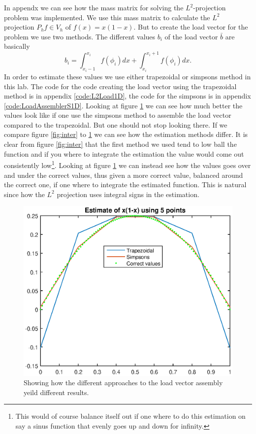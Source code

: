 \documentclass[11pt]{article}
\begin{document}
In appendx \label{code:L2mass1D} we can see how the mass matrix for solving the $L^2$-projection problem was implemented. We use this mass matrix to calculate the $L^2$ projection $P_h f \in V_h$ of $f(x) = x(1-x)$. But to create the load vector for the problem we use two methods. The different values $b_i$ of the load vector $\bar{b}$ are basically 
\begin{equation}
	b_i = \int_{x_i - 1}^{x_i} f(\phi_i) dx + \int_{x_i}^{x_i+1} f(\phi_i) dx.
\end{equation}
In order to estimate these values we use either trapezoidal or simpsons method in this lab. The code for the code creating the load vector using the trapezoidal method is in appendix \ref{code:L2Load1D}, the code for the simpsons is in appendix \ref{code:LoadAssemblerS1D}. Looking at figure \ref{fig:l2proj} we can see how much better the values look like if one use the simpsons method to assemble the load vector compared to the trapezoidal. But one should not stop looking there. If we compare figure \ref{fig:inter} to \ref{fig:l2proj} we can see how the estimation methods differ. It is clear from figure \ref{fig:inter} that the first method we used tend to low ball the function and if you where to integrate the estimation the value would come out consistently low\footnote{This would of course balance itself out if one where to do this estimation on say a sinus function that evenly goes up and down for infinity.}. Looking at figure \ref{fig:l2proj} we can instead see how the values goes over and under the correct values, thus given a more correct value, balanced around the correct one,  if one where to integrate the estimated function. This is natural since how the $L^2$ projection uses integral signs in the estimation. 
\begin{figure}[H]
	\centering
	\includegraphics[width=1\textwidth]{../ex1/l2proj}
	\caption{Showing how the different approaches to the load vector assembly yeild different results.}
	\label{fig:l2proj}
\end{figure}
\end{document}
